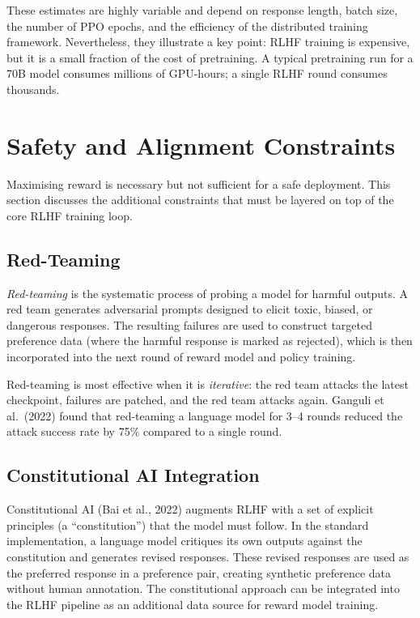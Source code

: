 These estimates are highly variable and depend on response length, batch size, the number of PPO epochs, and the efficiency of the distributed training framework. Nevertheless, they illustrate a key point: RLHF training is expensive, but it is a small fraction of the cost of pretraining. A typical pretraining run for a 70B model consumes millions of GPU-hours; a single RLHF round consumes thousands.

\section{Safety and Alignment Constraints}
\label{sec:safety-constraints}

Maximising reward is necessary but not sufficient for a safe deployment. This section discusses the additional constraints that must be layered on top of the core RLHF training loop.

\subsection{Red-Teaming}

\emph{Red-teaming} is the systematic process of probing a model for harmful outputs. A red team generates adversarial prompts designed to elicit toxic, biased, or dangerous responses. The resulting failures are used to construct targeted preference data (where the harmful response is marked as rejected), which is then incorporated into the next round of reward model and policy training.

Red-teaming is most effective when it is \emph{iterative}: the red team attacks the latest checkpoint, failures are patched, and the red team attacks again. Ganguli et al.\ (2022) found that red-teaming a language model for 3--4 rounds reduced the attack success rate by 75\% compared to a single round.

\subsection{Constitutional AI Integration}

Constitutional AI (Bai et al., 2022) augments RLHF with a set of explicit principles (a ``constitution'') that the model must follow. In the standard implementation, a language model critiques its own outputs against the constitution and generates revised responses. These revised responses are used as the preferred response in a preference pair, creating synthetic preference data without human annotation. The constitutional approach can be integrated into the RLHF pipeline as an additional data source for reward model training.

